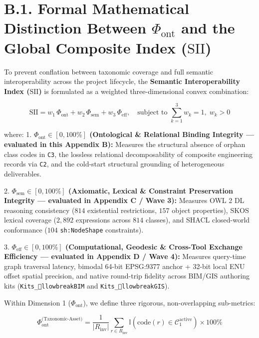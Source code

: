 \documentclass[10pt,a4paper]{article}
\begin{document}
\section*{B.1. Formal Mathematical Distinction Between $\Phi_{\text{ont}}$ and the Global Composite Index ($\text{SII}$)}

To prevent conflation between taxonomic coverage and full semantic interoperability across the project lifecycle, the \textbf{Semantic Interoperability Index ($\text{SII}$)} is formulated as a weighted three-dimensional convex combination:

\begin{equation*}
\text{SII} = w_1 \, \Phi_{\text{ont}} + w_2 \, \Phi_{\text{sem}} + w_3 \, \Phi_{\text{eff}}, \quad \text{subject to } \sum_{k=1}^{3} w_k = 1, \; w_k > 0
\end{equation*}

where:
1. \textbf{$\Phi_{\text{ont}} \in [0, 100\%]$ (Ontological \& Relational Binding Integrity --- evaluated in this Appendix B):} Measures the structural absence of orphan class codes in \texttt{C3}, the lossless relational decomposability of composite engineering records via \texttt{C2}, and the cold-start structural grounding of heterogeneous deliverables.\par
2. \textbf{$\Phi_{\text{sem}} \in [0, 100\%]$ (Axiomatic, Lexical \& Constraint Preservation Integrity --- evaluated in Appendix C / Wave 3):} Measures OWL 2 DL reasoning consistency ($814$ existential restrictions, $157$ object properties), SKOS lexical coverage ($2,892$ expressions across $814$ classes), and SHACL closed-world conformance ($104$ \texttt{sh:NodeShape} constraints).\par
3. \textbf{$\Phi_{\text{eff}} \in [0, 100\%]$ (Computational, Geodesic \& Cross-Tool Exchange Efficiency --- evaluated in Appendix D / Wave 4):} Measures query-time graph traversal latency, bimodal 64-bit EPSG:9377 anchor + 32-bit local ENU offset spatial precision, and native round-trip fidelity across BIM/GIS authoring kits (\texttt{Kits\_llowbreak{}BIM} and \texttt{Kits\_llowbreak{}GIS}).\par

Within Dimension 1 ($\Phi_{\text{ont}}$), we define three rigorous, non-overlapping sub-metrics:

\begin{equation*}
\Phi_{\text{ont}}^{\text{(Taxonomic-Asset)}} = \frac{1}{|R_{\text{inv}}|} \sum_{r \in R_{\text{inv}}} \mathbb{I}\!\left(\text{code}(r) \in \mathcal{C}_1^{\text{active}}\right) \times 100\%
\end{equation*}
\end{document}
